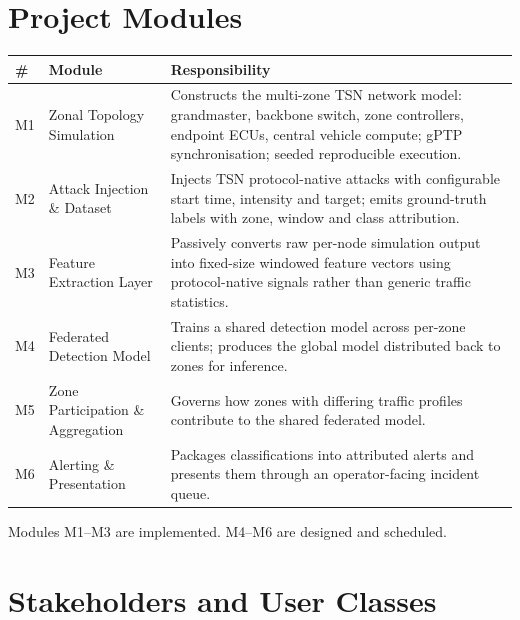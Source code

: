 \section{Project Modules}

\begin{longtable}{p{} p{} p{}}
\toprule
\textbf{\#} & \textbf{Module} & \textbf{Responsibility} \\
\midrule
\endhead
M1 & Zonal Topology Simulation & Constructs the multi-zone TSN network model:
grandmaster, backbone switch, zone controllers, endpoint ECUs, central vehicle
compute; gPTP synchronisation; seeded reproducible execution. \\
\addlinespace
M2 & Attack Injection \& Dataset & Injects TSN protocol-native attacks with
configurable start time, intensity and target; emits ground-truth labels with zone,
window and class attribution. \\
\addlinespace
M3 & Feature Extraction Layer & Passively converts raw per-node simulation output
into fixed-size windowed feature vectors using protocol-native signals rather than
generic traffic statistics. \\
\addlinespace
M4 & Federated Detection Model & Trains a shared detection model across per-zone
clients; produces the global model distributed back to zones for inference. \\
\addlinespace
M5 & Zone Participation \& Aggregation & Governs how zones with differing traffic
profiles contribute to the shared federated model. \\
\addlinespace
M6 & Alerting \& Presentation & Packages classifications into attributed alerts and
presents them through an operator-facing incident queue. \\
\bottomrule
\end{longtable}

Modules M1--M3 are implemented. M4--M6 are designed and scheduled.

\section{Stakeholders and User Classes}
\label{sec:stakeholders}

